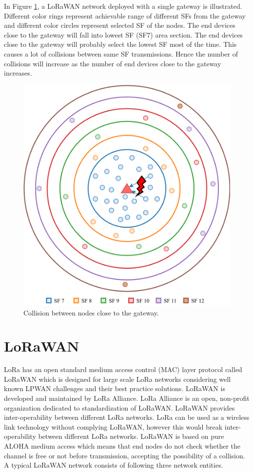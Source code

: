 \documentclass[conference]{IEEEtran}
\begin{document}
In Figure \ref{fig:collision}, a LoRaWAN network deployed with a single gateway is illustrated. Different color rings represent achievable range of different SFs from the gateway and different color circles represent selected SF of the nodes. The end devices close to the gateway will fall into lowest SF (SF7) area section. The end devices close to the gateway will probably select the lowest SF most of the time. This causes a lot of collisions between same SF transmissions. Hence the number of collisions will increase as the number of end devices close to the gateway increases.

\begin{figure}
\centering
\includegraphics[width=\linewidth]{collision}
\caption{Collision between nodes close to the gateway.}
\label{fig:collision}
\end{figure}


\section{LoRaWAN} \label{LoRaWAN}
LoRa has an open standard medium access control (MAC) layer protocol called LoRaWAN which is designed for large scale LoRa networks considering well known LPWAN challenges and their best practice solutions. LoRaWAN is developed and maintained by LoRa Alliance. LoRa Alliance is an open, non-profit organization dedicated to standardization of LoRaWAN. LoRaWAN provides inter-operability between different LoRa networks. LoRa can be used as a wireless link technology without complying LoRaWAN, however this would break inter-operability between different LoRa networks. LoRaWAN is based on pure ALOHA medium access which means that end nodes do not check whether the channel is free or not before transmission, accepting the possibility of a collision. A typical LoRaWAN network consists of following three network entities.
\end{document}
